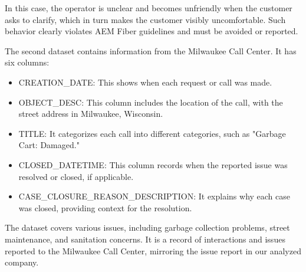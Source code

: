 In this case, the operator is unclear and becomes unfriendly when the customer asks to clarify, which in turn makes the customer visibly uncomfortable. Such behavior clearly violates AEM Fiber guidelines and must be avoided or reported.

The second dataset contains information from the Milwaukee Call Center. It has six columns:
\begin{itemize}
      \item CREATION\_DATE: This shows when each request or call was made.
      \item OBJECT\_DESC: This column includes the location of the call, with the street address in Milwaukee, Wisconsin.
      \item TITLE: It categorizes each call into different categories, such as "Garbage Cart: Damaged."
      \item CLOSED\_DATETIME: This column records when the reported issue was resolved or closed, if applicable.
      \item CASE\_CLOSURE\_REASON\_DESCRIPTION: It explains why each case was closed, providing context for the resolution.
\end{itemize}
The dataset covers various issues, including garbage collection problems, street maintenance, and sanitation concerns. It is a record of interactions and issues reported to the Milwaukee Call Center, mirroring the issue report in our analyzed company.
